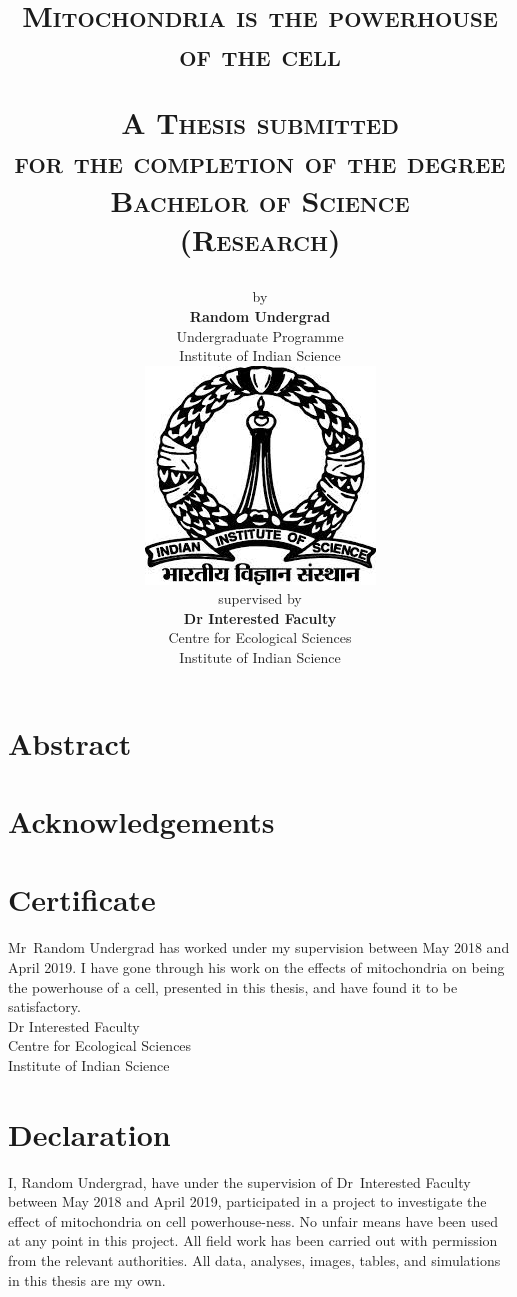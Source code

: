 \documentclass[a4paper, oneside, 11pt]{book}
\title{\thispagestyle{empty}\begin{singlespace}
	\Huge \vspace{-2cm}\textbf{\textsc{Mitochondria is the powerhouse of the cell}}\\ %
	\end{singlespace}
	\normalsize
	\vspace{4em}
	\textsc{A Thesis submitted\\for the completion of the degree\\\textbf{\textsc{\Large{Bachelor of Science\\\normalsize(Research)}}}}\\
}
\author{by \\\large{\sc \textbf{Random Undergrad}}\\\normalsize Undergraduate Programme\\Institute of Indian Science\\[3em]
	\includegraphics[scale=0.4]{IISc_logo.jpeg}\\[2em]
	supervised by \\\large{\sc\bfseries Dr Interested Faculty}\\
	Centre for Ecological Sciences\\
	Institute of Indian Science\\[1.5em]
}
\date{}
\begin{document}
\renewcommand{\thepage}{0}
\maketitle
\frontmatter


\chapter*{Abstract}
\lipsum[1-3]
\newpage
\chapter*{Acknowledgements}
\lipsum[1]

\newpage
\chapter*{Certificate}
Mr\ Random Undergrad has worked under my supervision between May 2018 and April 2019. 
I have gone through his work on the effects of mitochondria on being the powerhouse of a cell,
presented in this thesis, and have found it to be satisfactory.\\

Dr Interested Faculty\\
Centre for Ecological Sciences\\
Institute of Indian Science\\


\chapter*{Declaration}
I, Random Undergrad, have under the supervision of Dr\ Interested Faculty between May 2018 and April 2019,
participated in a project to investigate the effect of mitochondria on cell powerhouse-ness. 
No unfair means have been used at any point in this project. All field work has been carried out with
permission from the relevant authorities.
All data, analyses, images, tables, and simulations in this thesis are my own.\\
\end{document}
